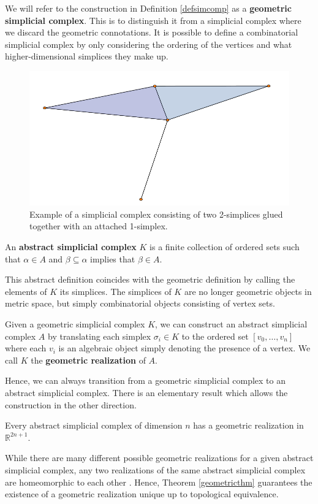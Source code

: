 We will refer to the construction in Definition \ref{defsimcomp} as a \textbf{geometric simplicial complex}. This is to distinguish it from a simplicial complex where we discard the geometric connotations. It is possible to define a combinatorial simplicial complex by only considering the ordering of the vertices and what higher-dimensional simplices they make up.

\begin{figure}
  \centering
  \includegraphics[scale=0.7]{complex.pdf}
  \caption{ \label{complex2} Example of a simplicial complex consisting of two 2-simplices glued together with an attached 1-simplex.}
\end{figure}

\begin{definition}  \label{defabstractsimcomp}
An \textbf{abstract simplicial complex} $K$ is a finite collection of ordered sets such that $\alpha \in A$ and $\beta \subseteq \alpha$ implies that $\beta \in A$.
\end{definition}

This abstract definition coincides with the geometric definition by calling the elements of $K$ its simplices. The simplices of $K$ are no longer geometric objects in metric space, but simply combinatorial objects consisting of vertex sets.

\begin{definition}
Given a geometric simplicial complex $K$, we can construct an abstract simplicial complex $A$ by translating each simplex $\sigma_{i} \in K$ to the ordered set $[v_{0},\dots,v_{n}]$ where each $v_{i}$ is an algebraic object simply denoting the presence of a vertex. We call $K$ the \textbf{geometric realization} of $A$.
\end{definition}
Hence, we can always transition from a geometric simplicial complex to an abstract simplicial complex. There is an elementary result which allows the construction in the other direction.
\begin{theorem}\label{geometricthm}
Every abstract simplicial complex of dimension $n$ has a geometric realization in $\mathbb{R}^{2n+1}$.
\end{theorem}
While there are many different possible geometric realizations for a given abstract simplicial complex, any two realizations of the same abstract simplicial complex are homeomorphic to each other \cite[Theorem 3.1, p. ~15]{munkres}. Hence, Theorem \ref{geometricthm} guarantees the existence of a geometric realization unique up to topological equivalence.

